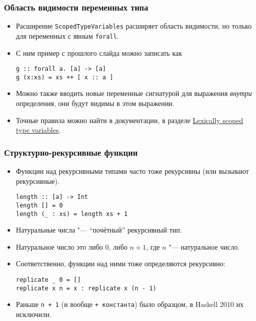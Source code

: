 \documentclass[10pt]{beamer}
\begin{document}
\begin{frame}[fragile]
\frametitle{Область видимости переменных типа}
\begin{itemize}
    \item Расширение \lstinline|ScopedTypeVariables| расширяет область видимости, но только для переменных с явным \lstinline|forall|.
    \item С ним пример с прошлого слайда можно записать как
\begin{lstlisting}
g :: forall a. [a] -> [a]
g (x:xs) = xs ++ [ x :: a ]
\end{lstlisting}
    \item Можно также вводить новые переменные сигнатурой для выражения \emph{внутри} определения, они будут видимы в этом выражении.
    \item Точные правила можно найти в документации, в разделе \href{http://downloads.haskell.org/~ghc/latest/docs/html/users_guide/glasgow_exts.html#lexically-scoped-type-variables}{Lexically scoped type variables}.
\end{itemize}
\end{frame}

\begin{frame}[fragile]
\frametitle{Структурно-рекурсивные функции}
\begin{itemize}
    \item Функции над рекурсивными типами часто тоже рекурсивны (или вызывают рекурсивные).
\begin{lstlisting}
length :: [a] -> Int
length [] = 0
length (_ : xs) = length xs + 1
\end{lstlisting}
    \item Натуральные числа "--- \enquote{почётный} рекурсивный тип.
    \pause
    \item Натуральное число это либо $0$, либо $n + 1$, где $n$ "--- натуральное число.
    \item Соответственно, функции над ними тоже определяются рекурсивно:
\begin{lstlisting}
replicate _ 0 = []
replicate x n = x : replicate x (n - 1)
\end{lstlisting}
\item Раньше \lstinline|n + 1| (и вообще \lstinline|+ константа|) было образцом, в Haskell 2010 их исключили.
\end{itemize}
\end{frame}
\end{document}
